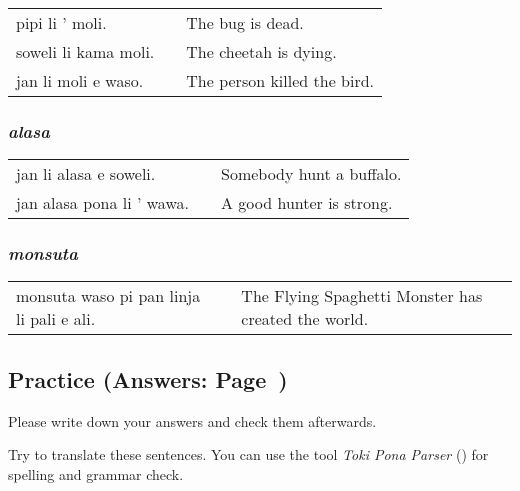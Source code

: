 \begin{supertabular}{p{5,5cm}|ll}
pipi li ' moli. && The bug is dead. \\
soweli li kama moli. && The cheetah is dying. \\
jan li moli e waso. && The person killed the bird. \\
\end{supertabular} 
%
%
\subsubsection*{\textit{alasa}}
%

\begin{supertabular}{p{5,5cm}|ll}
jan li alasa e soweli. && Somebody hunt a buffalo. \\
jan alasa pona li ' wawa. && A good hunter is strong. \\
\end{supertabular}

%
\subsubsection*{\textit{monsuta}}
%

\begin{supertabular}{p{5,5cm}|ll}
monsuta waso pi pan linja li pali e ali. &&  The Flying Spaghetti Monster has created the world. \\
\end{supertabular}

\newpage
%
\subsection*{Practice (Answers: Page~\pageref{'living_things'})}
%
Please write down your answers and check them afterwards. 

Try to translate these sentences. 
You can use the tool \textit{Toki Pona Parser} (\cite{www:rowa:02}) for spelling and grammar check. 

